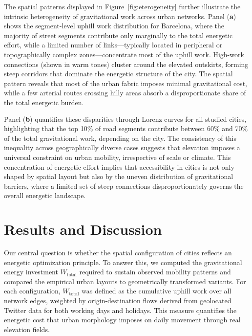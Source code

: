\documentclass[twocolumn,amsmath,amssymb,floatfix,nature,shownopacs,footinbib,superscriptaddress]{revtex4-1} %
\begin{document}
The spatial patterns displayed in Figure~\ref{fig:eterogeneity} further illustrate the intrinsic heterogeneity of gravitational work across urban networks. 
Panel (\textbf{a}) shows the segment-level uphill work distribution for Barcelona, where the majority of street segments contribute only marginally to the total energetic effort, while a limited number of links—typically located in peripheral or topographically complex zones—concentrate most of the uphill work. 
High-work connections (shown in warm tones) cluster around the elevated outskirts, forming steep corridors that dominate the energetic structure of the city. 
The spatial pattern reveals that most of the urban fabric imposes minimal gravitational cost, while a few arterial routes crossing hilly areas absorb a disproportionate share of the total energetic burden.

Panel (\textbf{b}) quantifies these disparities through Lorenz curves for all studied cities, highlighting that the top 10\% of road segments contribute between 60\% and 70\% of the total gravitational work, depending on the city. 
The consistency of this inequality across geographically diverse cases suggests that elevation imposes a universal constraint on urban mobility, irrespective of scale or climate. 
This concentration of energetic effort implies that accessibility in cities is not only shaped by spatial layout but also by the uneven distribution of gravitational barriers, where a limited set of steep connections disproportionately governs the overall energetic landscape.


\section*{Results and Discussion}

Our central question is whether the spatial configuration of cities reflects an energetic optimization principle. 
To answer this, we computed the gravitational energy investment $W_{\text{total}}$ required to sustain observed mobility patterns and compared the empirical urban layouts to geometrically transformed variants. 
For each configuration, $W_{\text{total}}$ was defined as the cumulative uphill work over all network edges, weighted by origin-destination flows derived from geolocated Twitter data for both working days and holidays. 
This measure quantifies the energetic cost that urban morphology imposes on daily movement through real elevation fields.
\end{document}
